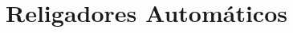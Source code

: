 \documentclass[oneside,openright,12pt]{ufsm_2021} %
\begin{document}
\section{Religadores Automáticos}




\startbibliography %

\end{document}
